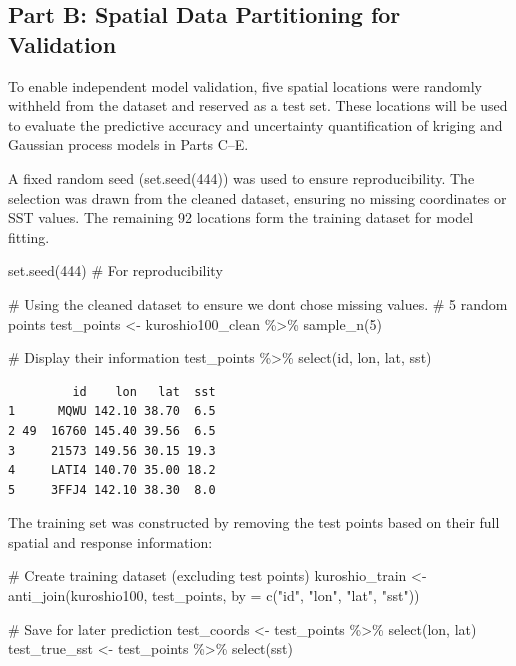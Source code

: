 \documentclass[
  11pt,
]{article}
\newenvironment{Shaded}{\begin{snugshade}}{\end{snugshade}}
\newcommand{\AttributeTok}[1]{\textcolor[rgb]{0.40,0.45,0.13}{#1}}
\newcommand{\CommentTok}[1]{\textcolor[rgb]{0.37,0.37,0.37}{#1}}
\newcommand{\DecValTok}[1]{\textcolor[rgb]{0.68,0.00,0.00}{#1}}
\newcommand{\FunctionTok}[1]{\textcolor[rgb]{0.28,0.35,0.67}{#1}}
\newcommand{\NormalTok}[1]{\textcolor[rgb]{0.00,0.23,0.31}{#1}}
\newcommand{\OtherTok}[1]{\textcolor[rgb]{0.00,0.23,0.31}{#1}}
\newcommand{\SpecialCharTok}[1]{\textcolor[rgb]{0.37,0.37,0.37}{#1}}
\newcommand{\StringTok}[1]{\textcolor[rgb]{0.13,0.47,0.30}{#1}}
\begin{document}
\subsection{Part B: Spatial Data Partitioning for
Validation}\label{part-b-spatial-data-partitioning-for-validation}

To enable independent model validation, five spatial locations were
randomly withheld from the dataset and reserved as a test set. These
locations will be used to evaluate the predictive accuracy and
uncertainty quantification of kriging and Gaussian process models in
Parts C--E.

A fixed random seed (set.seed(444)) was used to ensure reproducibility.
The selection was drawn from the cleaned dataset, ensuring no missing
coordinates or SST values. The remaining 92 locations form the training
dataset for model fitting.

\begin{Shaded}
\begin{Highlighting}[]
\FunctionTok{set.seed}\NormalTok{(}\DecValTok{444}\NormalTok{)  }\CommentTok{\# For reproducibility}

\CommentTok{\# Using the cleaned dataset to ensure we dont chose missing values.}
\CommentTok{\# 5 random points}
\NormalTok{test\_points }\OtherTok{\textless{}{-}}\NormalTok{ kuroshio100\_clean }\SpecialCharTok{\%\textgreater{}\%}
  \FunctionTok{sample\_n}\NormalTok{(}\DecValTok{5}\NormalTok{)}

\CommentTok{\# Display their information}
\NormalTok{test\_points }\SpecialCharTok{\%\textgreater{}\%}
  \FunctionTok{select}\NormalTok{(id, lon, lat, sst)}
\end{Highlighting}
\end{Shaded}

\begin{verbatim}
         id    lon   lat  sst
1      MQWU 142.10 38.70  6.5
2 49  16760 145.40 39.56  6.5
3     21573 149.56 30.15 19.3
4     LATI4 140.70 35.00 18.2
5     3FFJ4 142.10 38.30  8.0
\end{verbatim}

The training set was constructed by removing the test points based on
their full spatial and response information:

\begin{Shaded}
\begin{Highlighting}[]
\CommentTok{\# Create training dataset (excluding test points)}
\NormalTok{kuroshio\_train }\OtherTok{\textless{}{-}} \FunctionTok{anti\_join}\NormalTok{(kuroshio100, test\_points, }\AttributeTok{by =} \FunctionTok{c}\NormalTok{(}\StringTok{"id"}\NormalTok{, }\StringTok{"lon"}\NormalTok{, }\StringTok{"lat"}\NormalTok{, }\StringTok{"sst"}\NormalTok{))}

\CommentTok{\# Save for later prediction}
\NormalTok{test\_coords }\OtherTok{\textless{}{-}}\NormalTok{ test\_points }\SpecialCharTok{\%\textgreater{}\%} \FunctionTok{select}\NormalTok{(lon, lat)}
\NormalTok{test\_true\_sst }\OtherTok{\textless{}{-}}\NormalTok{ test\_points }\SpecialCharTok{\%\textgreater{}\%} \FunctionTok{select}\NormalTok{(sst)}
\end{Highlighting}
\end{Shaded}
\end{document}
